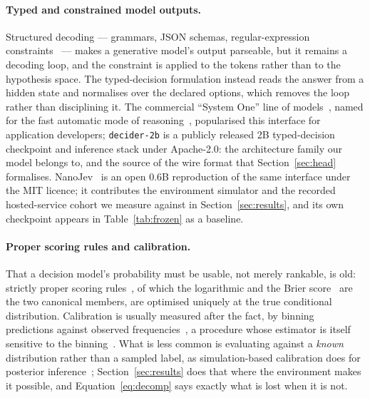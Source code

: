 \documentclass[11pt]{article}
\newcommand{\1}{\mathbf{1}}
\begin{document}
\paragraph{Typed and constrained model outputs.} Structured decoding --- grammars, JSON schemas,
regular-expression constraints~\cite{willard2023efficient,geng2023grammar} --- makes a generative
model's output parseable, but it remains a
decoding loop, and the constraint is applied to the tokens rather than to the hypothesis space. The
typed-decision formulation instead reads the answer from a hidden state and normalises over the
declared options, which removes the loop rather than disciplining it. The commercial ``System One''
line of models~\cite{almeida2026systemone}, named for the fast automatic mode of
reasoning~\cite{kahneman2011thinking}, popularised this interface for application developers; \texttt{decider-2b} is a
publicly released 2B typed-decision checkpoint and inference stack under Apache-2.0: the
architecture family our model belongs to, and the source of the wire format that
Section~\ref{sec:head} formalises. NanoJev~\cite{nanojev2026} is an open 0.6B reproduction of the
same interface under the MIT licence; it contributes the environment simulator and the recorded hosted-service cohort we
measure against in Section~\ref{sec:results}, and its own checkpoint appears in
Table~\ref{tab:frozen} as a baseline.

\paragraph{Proper scoring rules and calibration.} That a decision model's probability must be
usable, not merely rankable, is old: strictly proper scoring rules~\cite{gneiting2007proper}, of which the logarithmic and the
Brier score~\cite{brier1950verification} are the two canonical members, are optimised uniquely at
the true conditional distribution. Calibration is usually measured after the fact, by binning predictions against observed
frequencies~\cite{guo2017calibration,naeini2015obtaining,nixon2019measuring}, a procedure whose
estimator is itself sensitive to the binning~\cite{nixon2019measuring}. What is less common is
evaluating against a \emph{known} distribution rather than a sampled label, as simulation-based
calibration does for posterior inference~\cite{cook2006validation,talts2018validating}; Section~\ref{sec:results} does that where the environment makes it
possible, and Equation~\eqref{eq:decomp} says exactly what is lost when it is not.
\end{document}
